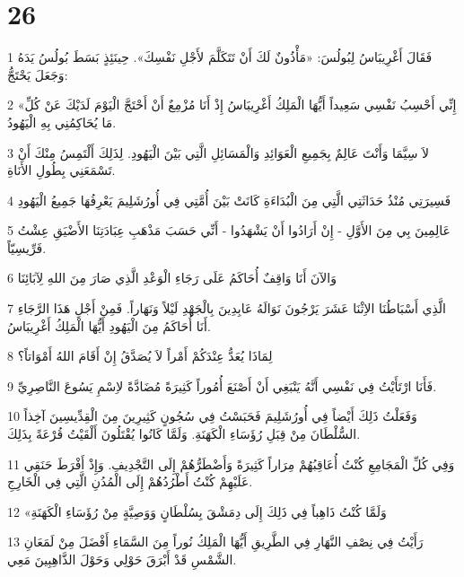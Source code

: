 \chapter{26}

\par 1 فَقَالَ أَغْرِيبَاسُ لِبُولُسَ: «مَأْذُونٌ لَكَ أَنْ تَتَكَلَّمَ لأَجْلِ نَفْسِكَ». حِينَئِذٍ بَسَطَ بُولُسُ يَدَهُ وَجَعَلَ يَحْتَجُّ:
\par 2 «إِنِّي أَحْسِبُ نَفْسِي سَعِيداً أَيُّهَا الْمَلِكُ أَغْرِيبَاسُ إِذْ أَنَا مُزْمِعٌ أَنْ أَحْتَجَّ الْيَوْمَ لَدَيْكَ عَنْ كُلِّ مَا يُحَاكِمُنِي بِهِ الْيَهُودُ.
\par 3 لاَ سِيَّمَا وَأَنْتَ عَالِمٌ بِجَمِيعِ الْعَوَائِدِ وَالْمَسَائِلِ الَّتِي بَيْنَ الْيَهُودِ. لِذَلِكَ أَلْتَمِسُ مِنْكَ أَنْ تَسْمَعَنِي بِطُولِ الأَنَاةِ.
\par 4 فَسِيرَتِي مُنْذُ حَدَاثَتِي الَّتِي مِنَ الْبُدَاءَةِ كَانَتْ بَيْنَ أُمَّتِي فِي أُورُشَلِيمَ يَعْرِفُهَا جَمِيعُ الْيَهُودِ
\par 5 عَالِمِينَ بِي مِنَ الأَوَّلِ - إِنْ أَرَادُوا أَنْ يَشْهَدُوا - أَنِّي حَسَبَ مَذْهَبِ عِبَادَتِنَا الأَضْيَقِ عِشْتُ فَرِّيسِيّاً.
\par 6 وَالآنَ أَنَا وَاقِفٌ أُحَاكَمُ عَلَى رَجَاءِ الْوَعْدِ الَّذِي صَارَ مِنَ اللهِ لِآبَائِنَا
\par 7 الَّذِي أَسْبَاطُنَا الاِثْنَا عَشَرَ يَرْجُونَ نَوَالَهُ عَابِدِينَ بِالْجَهْدِ لَيْلاً وَنَهَاراً. فَمِنْ أَجْلِ هَذَا الرَّجَاءِ أَنَا أُحَاكَمُ مِنَ الْيَهُودِ أَيُّهَا الْمَلِكُ أَغْرِيبَاسُ.
\par 8 لِمَاذَا يُعَدُّ عِنْدَكُمْ أَمْراً لاَ يُصَدَّقُ إِنْ أَقَامَ اللهُ أَمْوَاتاً؟
\par 9 فَأَنَا ارْتَأَيْتُ فِي نَفْسِي أَنَّهُ يَنْبَغِي أَنْ أَصْنَعَ أُمُوراً كَثِيرَةً مُضَادَّةً لاِسْمِ يَسُوعَ النَّاصِرِيِّ.
\par 10 وَفَعَلْتُ ذَلِكَ أَيْضاً فِي أُورُشَلِيمَ فَحَبَسْتُ فِي سُجُونٍ كَثِيرِينَ مِنَ الْقِدِّيسِينَ آخِذاً السُّلْطَانَ مِنْ قِبَلِ رُؤَسَاءِ الْكَهَنَةِ. وَلَمَّا كَانُوا يُقْتَلُونَ أَلْقَيْتُ قُرْعَةً بِذَلِكَ.
\par 11 وَفِي كُلِّ الْمَجَامِعِ كُنْتُ أُعَاقِبُهُمْ مِرَاراً كَثِيرَةً وَأَضْطَرُّهُمْ إِلَى التَّجْدِيفِ. وَإِذْ أَفْرَطَ حَنَقِي عَلَيْهِمْ كُنْتُ أَطْرُدُهُمْ إِلَى الْمُدُنِ الَّتِي فِي الْخَارِجِ.
\par 12 «وَلَمَّا كُنْتُ ذَاهِباً فِي ذَلِكَ إِلَى دِمَشْقَ بِسُلْطَانٍ وَوَصِيَّةٍ مِنْ رُؤَسَاءِ الْكَهَنَةِ
\par 13 رَأَيْتُ فِي نِصْفِ النَّهَارِ فِي الطَّرِيقِ أَيُّهَا الْمَلِكُ نُوراً مِنَ السَّمَاءِ أَفْضَلَ مِنْ لَمَعَانِ الشَّمْسِ قَدْ أَبْرَقَ حَوْلِي وَحَوْلَ الذَّاهِبِينَ مَعِي.
